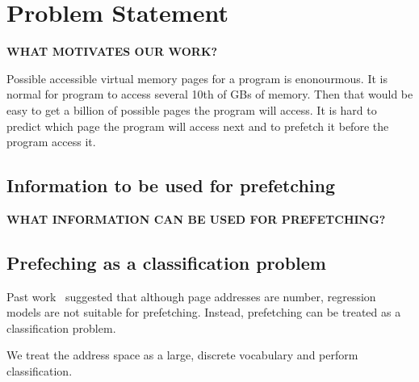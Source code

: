 
\section{Problem Statement} \label{sec:3}

\textbf{WHAT MOTIVATES OUR WORK?}

Possible accessible virtual memory pages for a program is enonourmous. It is normal for program to access several 10th of GBs of memory. Then that would be easy to get a billion of possible pages the program will access. It is hard to predict which page the program will access next and to prefetch it before the program access it.

\subsection{Information to be used for prefetching}

\textbf{WHAT INFORMATION CAN BE USED FOR PREFETCHING?}

\subsection{Prefeching as a classification problem}

Past work~\cite{LMAP} suggested that although page addresses are number, regression models are not suitable for prefetching. Instead, prefetching can be treated as a classification problem.

We treat the address space as a large, discrete vocabulary and perform classification. 
    


